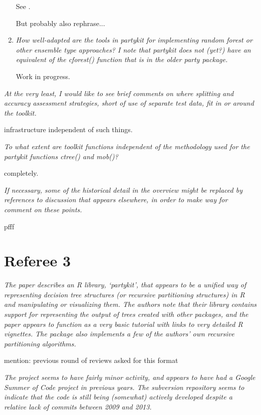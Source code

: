 \documentclass{article}
\begin{document}
\begin{enumerate}
See \citep{Hothorn+Hornik+Zeileis:2006}.

But probably also rephrase...

\item 
\textit{
How well-adapted are the tools in partykit for implementing random forest
or other ensemble type approaches? I note that partykit does not (yet?) have
an equivalent of the cforest() function that is in the older party package.
}

Work in progress.

\end{enumerate}

\textit{
At the very least, I would like to see brief comments on where splitting and
accuracy assessment strategies, short of use of separate test data, fit in
or around the toolkit.}  

infrastructure independent of such things.

\textit{To what extent are toolkit functions independent of
the methodology used for the partykit functions ctree() and mob()?}

completely.

\textit{If
necessary, some of the historical detail in the overview might be replaced
by references to discussion that appears elsewhere, in order to make way for
comment on these points.}

pfff

\section*{Referee 3}

\textit{
The paper describes an R library, `partykit', that appears to be a unified
way of representing decision tree structures (or recursive partitioning
structures) in R and manipulating or visualizing them.  The authors note
that their library contains support for representing the output of trees
created with other packages, and the paper appears to function as a very
basic tutorial with links to very detailed R vignettes.  The package also
implements a few of the authors' own recursive partitioning algorithms.}

mention: previous round of reviews asked for this format

\textit{
The project seems to have fairly minor activity, and appears to have had a
Google Summer of Code project in previous years.  The subversion repository
seems to indicate that the code is still being (somewhat) actively developed
despite a relative lack of commits between 2009 and 2013.}
\end{document}
